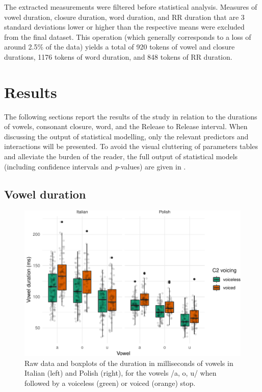 \documentclass[preprint]{JASAnew}
\begin{document}
The extracted measurements were filtered before statistical analysis.
Measures of vowel duration, closure duration, word duration, and RR
duration that are 3 standard deviations lower or higher than the
respective means were excluded from the final dataset. This operation
(which generally corresponds to a loss of around 2.5\% of the data)
yields a total of 920 tokens of vowel and closure durations, 1176 tokens
of word duration, and 848 tokens of RR duration.

\hypertarget{results}{%
\section{Results}\label{results}}

The following sections report the results of the study in relation to
the durations of vowels, consonant closure, word, and the Release to
Release interval. When discussing the output of statistical modelling,
only the relevant predictors and interactions will be presented. To
avoid the visual cluttering of parameters tables and alleviate the
burden of the reader, the full output of statistical models (including
confidence intervals and \emph{p}-values) are given in .

\hypertarget{vowel-duration}{%
\subsection{Vowel duration}\label{vowel-duration}}

\begin{figure}
\includegraphics[width=\linewidth]{2018-jasa_files/figure-latex/vowels-plot-1} \caption{Raw data and boxplots of the duration in milliseconds of vowels in Italian (left) and Polish (right), for the vowels /a, o, u/ when followed by a voiceless (green) or voiced (orange) stop. }\label{f:vowels-plot}
\end{figure}
\end{document}
